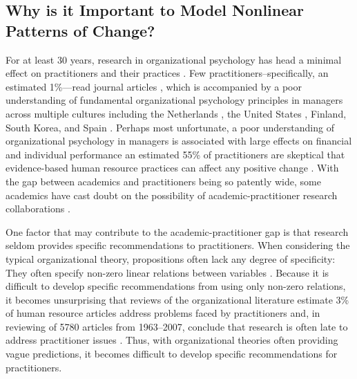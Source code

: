 \documentclass[
12pt, %
twoside,
english]{guelphthesis}
\begin{document}
\hypertarget{why-is-it-important-to-model-nonlinear-patterns-of-change}{%
\subsection{Why is it Important to Model Nonlinear Patterns of Change?}\label{why-is-it-important-to-model-nonlinear-patterns-of-change}}

For at least 30 years, research in organizational psychology has head a minimal effect on practitioners and their practices \autocites{daft1990}[for a review, see][]{lawler2022}. Few practitioners--specifically, an estimated 1\%---read journal articles \autocite{rynes2002a}, which is accompanied by a poor understanding of fundamental organizational psychology principles in managers across multiple cultures including the Netherlands \autocite{sanders2008}, the United States \autocite{rynes2002a}, Finland, South Korea, and Spain \autocite{tenhiälä2014}. Perhaps most unfortunate, a poor understanding of organizational psychology in managers is associated with large effects on financial and individual performance \autocite[for a review, see][]{rynes2002b} an estimated 55\% of practitioners are skeptical that evidence-based human resource practices can affect any positive change \autocite{kpmg2015}. With the gap between academics and practitioners being so patently wide, some academics have cast doubt on the possibility of academic-practitioner research collaborations \autocite{kieser2009}.

One factor that may contribute to the academic-practitioner gap is that research seldom provides specific recommendations to practitioners. When considering the typical organizational theory, propositions often lack any degree of specificity: They often specify non-zero linear relations between variables \autocite{edwards2010}. Because it is difficult to develop specific recommendations from using only non-zero relations, it becomes unsurprising that reviews of the organizational literature estimate 3\% of human resource articles address problems faced by practitioners \autocite{sackett1990} and, in reviewing of 5780 articles from 1963--2007, conclude that research is often late to address practitioner issues \autocite{cascio2008}. Thus, with organizational theories often providing vague predictions, it becomes difficult to develop specific recommendations for practitioners.
\end{document}
